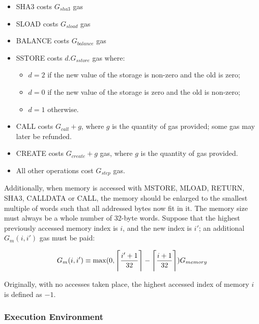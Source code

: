 \documentclass[9pt,oneside]{amsart}
\DeclarePairedDelimiter{\ceil}{\lceil}{\rceil}
\begin{document}
\begin{multicols}{2}
\begin{itemize}
\item {\small SHA3} costs $G_{sha3}$ gas
\item {\small SLOAD} costs $G_{sload}$ gas
\item {\small BALANCE} costs $G_{balance}$ gas
\item {\small SSTORE} costs $d.G_{sstore}$ gas where:
\begin{itemize}
\item $d = 2$ if the new value of the storage is non-zero and the old is zero;
\item $d = 0$ if the new value of the storage is zero and the old is non-zero;
\item $d = 1$ otherwise.
\end{itemize}
\item {\small CALL} costs $G_{call} + g$, where $g$ is the quantity of gas provided; some gas may later be refunded.
\item {\small CREATE} costs $G_{create} + g$ gas, where $g$ is the quantity of gas provided.
\item All other operations cost $G_{step}$ gas.
\end{itemize}

Additionally, when memory is accessed with {\small MSTORE}, {\small MLOAD}, {\small RETURN}, {\small SHA3}, {\small CALLDATA} or {\small CALL}, the memory should be enlarged to the smallest multiple of words such that all addressed bytes now fit in it. The memory size must always be a whole number of 32-byte words. Suppose that the highest previously accessed memory index is $i$, and the new index is $i'$; an additional $G_{m}(i, i')$ gas must be paid:

\begin{equation}
G_{m}(i, i') \equiv \max(0, \ceil[\Bigg]{\frac{i'+1}{32}} - \ceil[\Bigg]{\frac{i+1}{32}}) G_{memory}
\end{equation}

Originally, with no accesses taken place, the highest accessed index of memory $i$ is defined as $-1$.


\subsubsection{Execution Environment}


\end{multicols}
\end{document}
